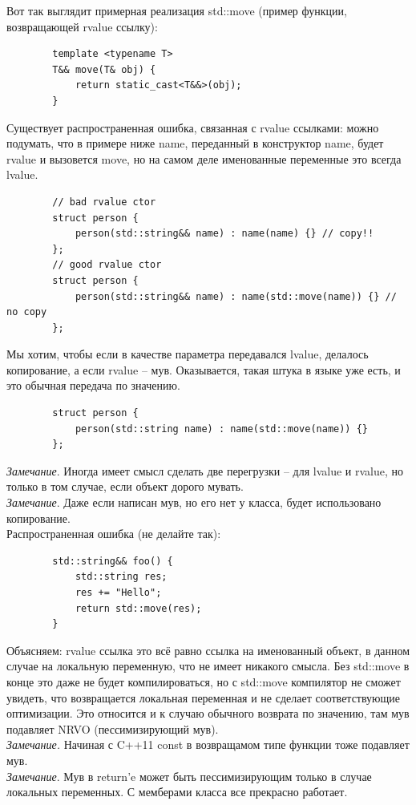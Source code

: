 \documentclass[12pt, a4paper]{article}
\begin{document}
	Вот так выглядит примерная реализация std::move (пример функции, возвращающей rvalue ссылку):
	\begin{verbatim}
		template <typename T>
		T&& move(T& obj) {
			return static_cast<T&&>(obj);
		}
	\end{verbatim}
	Существует распространенная ошибка, связанная с rvalue ссылками: можно подумать, что в примере ниже name, переданный в конструктор name, будет rvalue и вызовется move, но на самом деле именованные переменные это всегда lvalue.
	\begin{verbatim}
		// bad rvalue ctor
		struct person {
			person(std::string&& name) : name(name) {} // copy!! 
		};
		// good rvalue ctor
		struct person {
			person(std::string&& name) : name(std::move(name)) {} // no copy 
		};
	\end{verbatim}
	Мы хотим, чтобы если в качестве параметра передавался lvalue, делалось копирование, а если rvalue -- мув. Оказывается, такая штука в языке уже есть, и это обычная передача по значению.
	\begin{verbatim}
		struct person {
			person(std::string name) : name(std::move(name)) {}
		};
	\end{verbatim}
	\textit{Замечание}. Иногда имеет смысл сделать две перегрузки -- для lvalue и rvalue, но только в том случае, если объект дорого мувать.\\
	\textit{Замечание}. Даже если написан мув, но его нет у класса, будет использовано копирование.
	\\Распространенная ошибка (не делайте так):
	\begin{verbatim}
		std::string&& foo() {
			std::string res;
			res += "Hello";
			return std::move(res);
		}
	\end{verbatim}
	Объясняем: rvalue ссылка это всё равно ссылка на именованный объект, в данном случае на локальную переменную, что не имеет никакого смысла. Без std::move в конце это даже не будет компилироваться, но с std::move компилятор не сможет увидеть, что возвращается локальная переменная и не сделает соответствующие оптимизации. Это относится и к случаю обычного возврата по значению, там мув подавляет NRVO (пессимизирующий мув).\\
	\textit{Замечание.} Начиная с C++11 const в возвращамом типе функции тоже подавляет мув. \\
	\textit{Замечание}. Мув в return'e может быть пессимизирующим только в случае локальных переменных. С мемберами класса все прекрасно работает.\\
\end{document}

